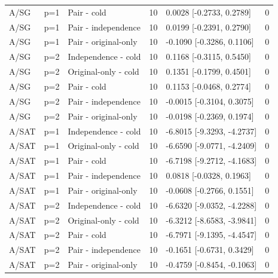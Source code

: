 \begin{longtable}{lllrlr}
A/SG & p=1 & Pair - cold & 10 & 0.0028 [-0.2733, 0.2789] & 0 \\
A/SG & p=1 & Pair - independence & 10 & 0.0199 [-0.2391, 0.2790] & 0 \\
A/SG & p=1 & Pair - original-only & 10 & -0.1090 [-0.3286, 0.1106] & 0 \\
A/SG & p=2 & Independence - cold & 10 & 0.1168 [-0.3115, 0.5450] & 0 \\
A/SG & p=2 & Original-only - cold & 10 & 0.1351 [-0.1799, 0.4501] & 0 \\
A/SG & p=2 & Pair - cold & 10 & 0.1153 [-0.0468, 0.2774] & 0 \\
A/SG & p=2 & Pair - independence & 10 & -0.0015 [-0.3104, 0.3075] & 0 \\
A/SG & p=2 & Pair - original-only & 10 & -0.0198 [-0.2369, 0.1974] & 0 \\
A/SAT & p=1 & Independence - cold & 10 & -6.8015 [-9.3293, -4.2737] & 0 \\
A/SAT & p=1 & Original-only - cold & 10 & -6.6590 [-9.0771, -4.2409] & 0 \\
A/SAT & p=1 & Pair - cold & 10 & -6.7198 [-9.2712, -4.1683] & 0 \\
A/SAT & p=1 & Pair - independence & 10 & 0.0818 [-0.0328, 0.1963] & 0 \\
A/SAT & p=1 & Pair - original-only & 10 & -0.0608 [-0.2766, 0.1551] & 0 \\
A/SAT & p=2 & Independence - cold & 10 & -6.6320 [-9.0352, -4.2288] & 0 \\
A/SAT & p=2 & Original-only - cold & 10 & -6.3212 [-8.6583, -3.9841] & 0 \\
A/SAT & p=2 & Pair - cold & 10 & -6.7971 [-9.1395, -4.4547] & 0 \\
A/SAT & p=2 & Pair - independence & 10 & -0.1651 [-0.6731, 0.3429] & 0 \\
A/SAT & p=2 & Pair - original-only & 10 & -0.4759 [-0.8454, -0.1063] & 0 \\
\hline\end{longtable}
